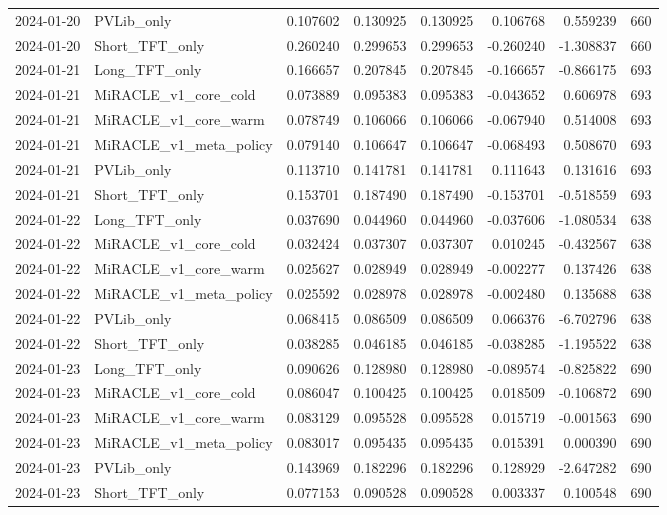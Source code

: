 \begin{tabular}{llrrrrrr}
2024-01-20 & PVLib_only & 0.107602 & 0.130925 & 0.130925 & 0.106768 & 0.559239 & 660 \\
2024-01-20 & Short_TFT_only & 0.260240 & 0.299653 & 0.299653 & -0.260240 & -1.308837 & 660 \\
2024-01-21 & Long_TFT_only & 0.166657 & 0.207845 & 0.207845 & -0.166657 & -0.866175 & 693 \\
2024-01-21 & MiRACLE_v1_core_cold & 0.073889 & 0.095383 & 0.095383 & -0.043652 & 0.606978 & 693 \\
2024-01-21 & MiRACLE_v1_core_warm & 0.078749 & 0.106066 & 0.106066 & -0.067940 & 0.514008 & 693 \\
2024-01-21 & MiRACLE_v1_meta_policy & 0.079140 & 0.106647 & 0.106647 & -0.068493 & 0.508670 & 693 \\
2024-01-21 & PVLib_only & 0.113710 & 0.141781 & 0.141781 & 0.111643 & 0.131616 & 693 \\
2024-01-21 & Short_TFT_only & 0.153701 & 0.187490 & 0.187490 & -0.153701 & -0.518559 & 693 \\
2024-01-22 & Long_TFT_only & 0.037690 & 0.044960 & 0.044960 & -0.037606 & -1.080534 & 638 \\
2024-01-22 & MiRACLE_v1_core_cold & 0.032424 & 0.037307 & 0.037307 & 0.010245 & -0.432567 & 638 \\
2024-01-22 & MiRACLE_v1_core_warm & 0.025627 & 0.028949 & 0.028949 & -0.002277 & 0.137426 & 638 \\
2024-01-22 & MiRACLE_v1_meta_policy & 0.025592 & 0.028978 & 0.028978 & -0.002480 & 0.135688 & 638 \\
2024-01-22 & PVLib_only & 0.068415 & 0.086509 & 0.086509 & 0.066376 & -6.702796 & 638 \\
2024-01-22 & Short_TFT_only & 0.038285 & 0.046185 & 0.046185 & -0.038285 & -1.195522 & 638 \\
2024-01-23 & Long_TFT_only & 0.090626 & 0.128980 & 0.128980 & -0.089574 & -0.825822 & 690 \\
2024-01-23 & MiRACLE_v1_core_cold & 0.086047 & 0.100425 & 0.100425 & 0.018509 & -0.106872 & 690 \\
2024-01-23 & MiRACLE_v1_core_warm & 0.083129 & 0.095528 & 0.095528 & 0.015719 & -0.001563 & 690 \\
2024-01-23 & MiRACLE_v1_meta_policy & 0.083017 & 0.095435 & 0.095435 & 0.015391 & 0.000390 & 690 \\
2024-01-23 & PVLib_only & 0.143969 & 0.182296 & 0.182296 & 0.128929 & -2.647282 & 690 \\
2024-01-23 & Short_TFT_only & 0.077153 & 0.090528 & 0.090528 & 0.003337 & 0.100548 & 690 \\

\end{tabular}
